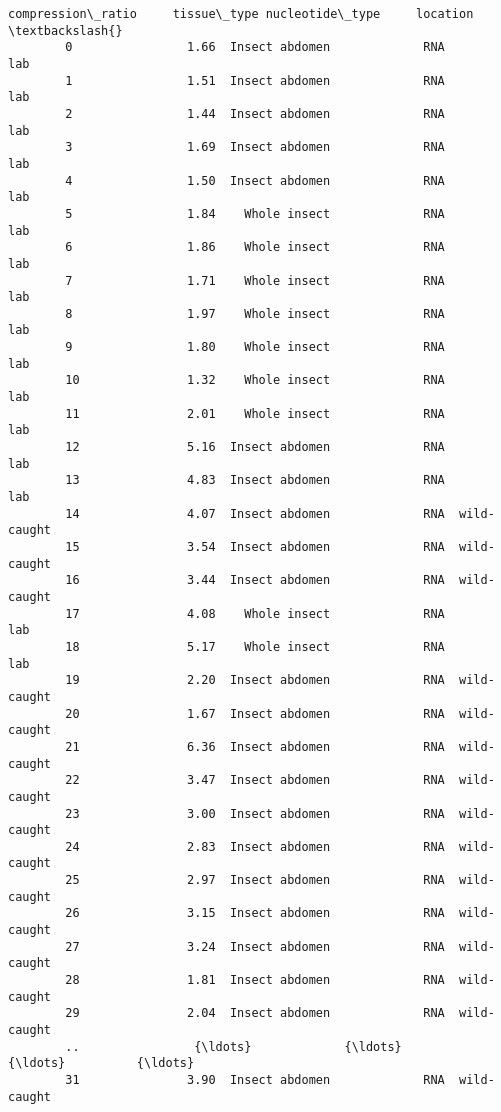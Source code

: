 \documentclass[11pt]{article}
\begin{document}
\begin{Verbatim}[commandchars=\\\{\}]
            compression\_ratio     tissue\_type nucleotide\_type     location  \textbackslash{}
        0                1.66  Insect abdomen             RNA          lab   
        1                1.51  Insect abdomen             RNA          lab   
        2                1.44  Insect abdomen             RNA          lab   
        3                1.69  Insect abdomen             RNA          lab   
        4                1.50  Insect abdomen             RNA          lab   
        5                1.84    Whole insect             RNA          lab   
        6                1.86    Whole insect             RNA          lab   
        7                1.71    Whole insect             RNA          lab   
        8                1.97    Whole insect             RNA          lab   
        9                1.80    Whole insect             RNA          lab   
        10               1.32    Whole insect             RNA          lab   
        11               2.01    Whole insect             RNA          lab   
        12               5.16  Insect abdomen             RNA          lab   
        13               4.83  Insect abdomen             RNA          lab   
        14               4.07  Insect abdomen             RNA  wild-caught   
        15               3.54  Insect abdomen             RNA  wild-caught   
        16               3.44  Insect abdomen             RNA  wild-caught   
        17               4.08    Whole insect             RNA          lab   
        18               5.17    Whole insect             RNA          lab   
        19               2.20  Insect abdomen             RNA  wild-caught   
        20               1.67  Insect abdomen             RNA  wild-caught   
        21               6.36  Insect abdomen             RNA  wild-caught   
        22               3.47  Insect abdomen             RNA  wild-caught   
        23               3.00  Insect abdomen             RNA  wild-caught   
        24               2.83  Insect abdomen             RNA  wild-caught   
        25               2.97  Insect abdomen             RNA  wild-caught   
        26               3.15  Insect abdomen             RNA  wild-caught   
        27               3.24  Insect abdomen             RNA  wild-caught   
        28               1.81  Insect abdomen             RNA  wild-caught   
        29               2.04  Insect abdomen             RNA  wild-caught   
        ..                {\ldots}             {\ldots}             {\ldots}          {\ldots}   
        31               3.90  Insect abdomen             RNA  wild-caught   

\end{Verbatim}
\end{document}
